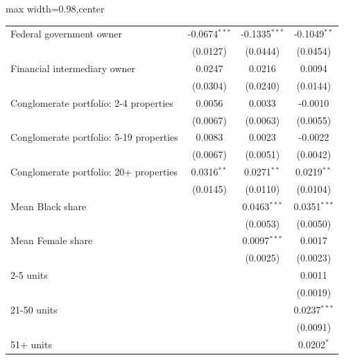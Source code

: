 \begin{table}[htbp]
\begin{adjustbox}{max width=0.98\textwidth,center}
\begin{tabular}{lccc}
         Federal government owner                & -0.0674$^{***}$ & -0.1335$^{***}$ & -0.1049$^{**}$\\   
                                                 & (0.0127)        & (0.0444)        & (0.0454)\\   
         Financial intermediary owner            & 0.0247          & 0.0216          & 0.0094\\   
                                                 & (0.0304)        & (0.0240)        & (0.0144)\\   
         Conglomerate portfolio: 2-4 properties  & 0.0056          & 0.0033          & -0.0010\\   
                                                 & (0.0067)        & (0.0063)        & (0.0055)\\   
         Conglomerate portfolio: 5-19 properties & 0.0083          & 0.0023          & -0.0022\\   
                                                 & (0.0067)        & (0.0051)        & (0.0042)\\   
         Conglomerate portfolio: 20+ properties  & 0.0316$^{**}$   & 0.0271$^{**}$   & 0.0219$^{**}$\\   
                                                 & (0.0145)        & (0.0110)        & (0.0104)\\   
         Mean Black share                        &                 & 0.0463$^{***}$  & 0.0351$^{***}$\\   
                                                 &                 & (0.0053)        & (0.0050)\\   
         Mean Female share                       &                 & 0.0097$^{***}$  & 0.0017\\   
                                                 &                 & (0.0025)        & (0.0023)\\   
         2-5 units                               &                 &                 & 0.0011\\   
                                                 &                 &                 & (0.0019)\\   
         21-50 units                             &                 &                 & 0.0237$^{***}$\\   
                                                 &                 &                 & (0.0091)\\   
         51+ units                               &                 &                 & 0.0202$^{*}$\\   

\end{tabular}
\end{adjustbox}
\end{table}
